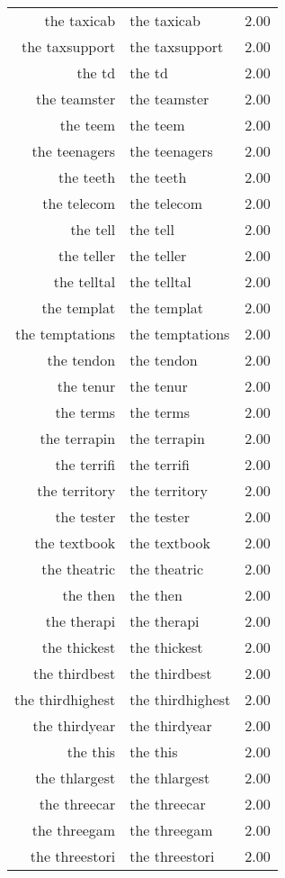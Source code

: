 \begin{table}[ht]
\begin{tabular}{rlr}
  the taxicab & the taxicab & 2.00 \\ 
  the taxsupport & the taxsupport & 2.00 \\ 
  the td & the td & 2.00 \\ 
  the teamster & the teamster & 2.00 \\ 
  the teem & the teem & 2.00 \\ 
  the teenagers & the teenagers & 2.00 \\ 
  the teeth & the teeth & 2.00 \\ 
  the telecom & the telecom & 2.00 \\ 
  the tell & the tell & 2.00 \\ 
  the teller & the teller & 2.00 \\ 
  the telltal & the telltal & 2.00 \\ 
  the templat & the templat & 2.00 \\ 
  the temptations & the temptations & 2.00 \\ 
  the tendon & the tendon & 2.00 \\ 
  the tenur & the tenur & 2.00 \\ 
  the terms & the terms & 2.00 \\ 
  the terrapin & the terrapin & 2.00 \\ 
  the terrifi & the terrifi & 2.00 \\ 
  the territory & the territory & 2.00 \\ 
  the tester & the tester & 2.00 \\ 
  the textbook & the textbook & 2.00 \\ 
  the theatric & the theatric & 2.00 \\ 
  the then & the then & 2.00 \\ 
  the therapi & the therapi & 2.00 \\ 
  the thickest & the thickest & 2.00 \\ 
  the thirdbest & the thirdbest & 2.00 \\ 
  the thirdhighest & the thirdhighest & 2.00 \\ 
  the thirdyear & the thirdyear & 2.00 \\ 
  the this & the this & 2.00 \\ 
  the thlargest & the thlargest & 2.00 \\ 
  the threecar & the threecar & 2.00 \\ 
  the threegam & the threegam & 2.00 \\ 
  the threestori & the threestori & 2.00 \\ 

\end{tabular}
\end{table}
